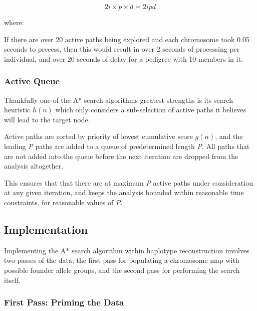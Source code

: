 \begin{equation}\label{eqn:time2proc}
2i \times p \times d = 2ipd
\end{equation}

where:
\begin{description}
\end{description}

If there are over 20 active paths being explored and each chromosome took 0.05 seconds to precess, then this would result in over 2 seconds of processing per individual, and over 20 seconds of delay for a pedigree with 10 members in it.

\subsubsection*{Active Queue}

Thankfully one of the A* search algorithms greatest strengths is its search heuristic $h(n)$ which only considers a sub-selection of active paths it believes will lead to the target node. 

Active paths are sorted by priority of lowest cumulative score $g(n)$, and the leading \textit{P} paths are added to a queue of predetermined length \textit{P}. All paths that are not added into the queue before the next iteration are dropped from the analysis altogether. 

This ensures that that there are at maximum \textit{P} active paths under consideration at any given iteration, and keeps the analysis bounded within reasonable time constraints, for reasonable values of \textit{P}.


\subsection{Implementation}

Implementing the A* search algorithm within haplotype reconstruction involves two passes of the data; the first pass for populating a chromosome map with possible founder allele groups, and the second pass for performing the search itself.

\subsubsection*{First Pass: Priming the Data}

